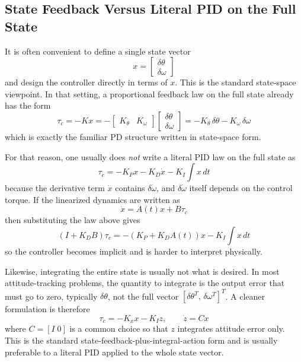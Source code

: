 \documentclass[11pt]{article}
\begin{document}
\subsection{State Feedback Versus Literal PID on the Full State}
It is often convenient to define a single state vector
\begin{equation}
    x = \begin{bmatrix} \delta\theta \\ \delta\omega \end{bmatrix}
\end{equation}
and design the controller directly in terms of $x$. This is the standard state-space viewpoint. In that setting, a proportional feedback law on the full state already has the form
\begin{equation}
    \tau_{c} = -Kx = -\begin{bmatrix} K_{\theta} & K_{\omega} \end{bmatrix}
    \begin{bmatrix} \delta\theta \\ \delta\omega \end{bmatrix}
    = -K_{\theta} \, \delta\theta - K_{\omega} \, \delta\omega
\end{equation}
which is exactly the familiar PD structure written in state-space form.

For that reason, one usually does \emph{not} write a literal PID law on the full state as
\begin{equation}
    \tau_{c} = -K_{P} x - K_{D} \dot{x} - K_{I} \int x \, dt
\end{equation}
because the derivative term $\dot{x}$ contains $\delta\dot{\omega}$, and $\delta\dot{\omega}$ itself depends on the control torque. If the linearized dynamics are written as
\begin{equation}
    \dot{x} = A(t)x + B\tau_{c}
\end{equation}
then substituting the law above gives
\begin{equation}
    (I + K_{D} B) \tau_{c} = -(K_{P} + K_{D} A(t))x - K_{I} \int x \, dt
\end{equation}
so the controller becomes implicit and is harder to interpret physically.

Likewise, integrating the entire state is usually not what is desired. In most attitude-tracking problems, the quantity to integrate is the output error that must go to zero, typically $\delta\theta$, not the full vector $[\delta\theta^{T}, \, \delta\omega^{T}]^{T}$. A cleaner formulation is therefore
\begin{equation}
    \tau_{c} = -K_{x} x - K_{I} z,
    \qquad
    \dot{z} = Cx
\end{equation}
where $C = [I \; 0]$ is a common choice so that $z$ integrates attitude error only. This is the standard state-feedback-plus-integral-action form and is usually preferable to a literal PID applied to the whole state vector.
\end{document}
